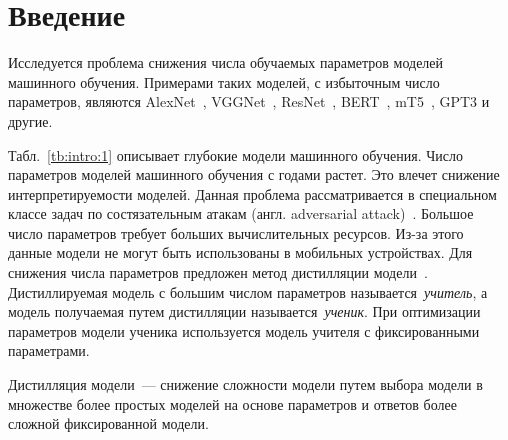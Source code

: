 \documentclass[12pt]{a&t}
\begin{document}
\section{Введение}
Исследуется проблема снижения числа обучаемых параметров моделей машинного обучения. Примерами таких моделей, с избыточным число параметров, являются AlexNet~\cite{Krizhevsky2012}, VGGNet~\cite{Simonyan2014}, ResNet~\cite{Kaiming2015}, BERT~\cite{Devlin2018, Vaswani2017}, mT5~\cite{Linting2021}, GPT3\cite{Brown2020} и другие.
\begin{table}[h!]
\caption{Число параметров в моделях машинного обучения.}
\label{tb:intro:1}
\begin{center}
\end{center}
\end{table}
Табл.~\ref{tb:intro:1} описывает глубокие модели машинного обучения.
Число параметров моделей машинного обучения с годами растет.
Это влечет снижение интерпретируемости моделей.
Данная проблема рассматривается в специальном классе задач по состязательным атакам (англ. adversarial attack)~\cite{Zheng2020}.
Большое число параметров требует больших вычислительных ресурсов.
Из-за этого данные модели не могут быть использованы в мобильных устройствах.
Для снижения числа параметров предложен метод дистилляции модели~\cite{Hinton2015, Vapnik2015, Lopez2016}.
Дистиллируемая модель с большим числом параметров называется~\textit{учитель}, а модель получаемая путем дистилляции называется~\textit{ученик}.
При оптимизации параметров модели ученика используется модель учителя с фиксированными параметрами.
\begin{definition}
Дистилляция модели~--- снижение сложности модели путем выбора модели в множестве более простых моделей на основе параметров и ответов более сложной фиксированной модели.
\end{definition}
\end{document}

